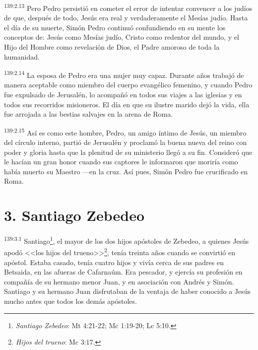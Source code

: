 \par 
\textsuperscript{139:2.13} Pero Pedro persistió en cometer el error de intentar convencer a los judíos de que, después de todo, Jesús era real y verdaderamente el Mesías judío. Hasta el día de su muerte, Simón Pedro continuó confundiendo en su mente los conceptos de: Jesús como Mesías judío, Cristo como redentor del mundo, y el Hijo del Hombre como revelación de Dios, el Padre amoroso de toda la humanidad.

\par 
\textsuperscript{139:2.14} La esposa de Pedro era una mujer muy capaz. Durante años trabajó de manera aceptable como miembro del cuerpo evangélico femenino, y cuando Pedro fue expulsado de Jerusalén, lo acompañó en todos sus viajes a las iglesias y en todos sus recorridos misioneros. El día en que su ilustre marido dejó la vida, ella fue arrojada a las bestias salvajes en la arena de Roma.

\par 
\textsuperscript{139:2.15} Así es como este hombre, Pedro, un amigo íntimo de Jesús, un miembro del círculo interno, partió de Jerusalén y proclamó la buena nueva del reino con poder y gloria hasta que la plenitud de su ministerio llegó a su fin. Consideró que le hacían un gran honor cuando sus captores le informaron que moriría como había muerto su Maestro ---en la cruz. Así pues, Simón Pedro fue crucificado en Roma.

\section*{3. Santiago Zebedeo}
\par 
\textsuperscript{139:3.1} Santiago\footnote{\textit{Santiago Zebedeo}: Mt 4:21-22; Mc 1:19-20; Lc 5:10.}, el mayor de los dos hijos apóstoles de Zebedeo, a quienes Jesús apodó <<los hijos del trueno>>\footnote{\textit{Hijos del trueno}: Mc 3:17.}, tenía treinta años cuando se convirtió en apóstol. Estaba casado, tenía cuatro hijos y vivía cerca de sus padres en Betsaida, en las afueras de Cafarnaúm. Era pescador, y ejercía su profesión en compañía de su hermano menor Juan, y en asociación con Andrés y Simón. Santiago y su hermano Juan disfrutaban de la ventaja de haber conocido a Jesús mucho antes que todos los demás apóstoles.

